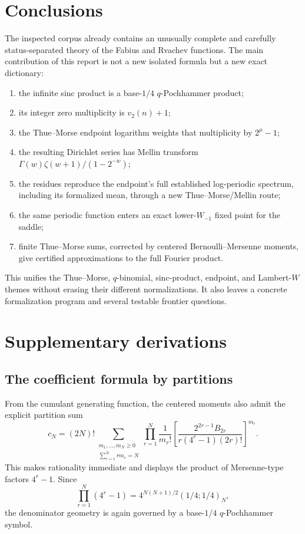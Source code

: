 \documentclass[11pt,oneside]{article}
\theoremstyle{definition}
\theoremstyle{remark}
\newcommand{\vtwo}{v_2}
\begin{document}
\section{Conclusions}
The inspected corpus already contains an unusually complete and carefully status-separated
theory of the Fabius and Rvachev functions.  The main contribution of this report is not a
new isolated formula but a new exact dictionary:
\begin{enumerate}
\item the infinite sinc product is a base-$1/4$ $q$-Pochhammer product;
\item its integer zero multiplicity is $\vtwo(n)+1$;
\item the Thue--Morse endpoint logarithm weights that multiplicity by $2^\mu-1$;
\item the resulting Dirichlet series has Mellin transform
$\Gamma(w)\zeta(w+1)/(1-2^{-w})$;
\item the residues reproduce the endpoint's full established log-periodic spectrum,
including its formalized mean, through a new Thue--Morse/Mellin route;
\item the same periodic function enters an exact lower-$W_{-1}$ fixed point for the saddle;
\item finite Thue--Morse sums, corrected by centered Bernoulli--Mersenne moments, give
certified approximations to the full Fourier product.
\end{enumerate}
This unifies the Thue--Morse, $q$-binomial, sinc-product, endpoint, and Lambert-$W$ themes
without erasing their different normalizations.  It also leaves a concrete formalization
program and several testable frontier questions.

\appendix
\section{Supplementary derivations}

\subsection{The coefficient formula by partitions}
From the cumulant generating function, the centered moments also admit the explicit
partition sum
\begin{equation}
 c_N=(2N)!\!\sum_{\substack{m_1,\ldots,m_N\ge0\\
                    \sum_{r=1}^Nrm_r=N}}
 \prod_{r=1}^N\frac1{m_r!}
 \left[
  \frac{2^{2r-1}B_{2r}}{r(4^r-1)(2r)!}
 \right]^{m_r}.                                            \label{eq:partition-moments}
\end{equation}
This makes rationality immediate and displays the product of Mersenne-type factors
$4^r-1$.  Since
\[
 \prod_{r=1}^N(4^r-1)=4^{N(N+1)/2}(1/4;1/4)_N,
\]
the denominator geometry is again governed by a base-$1/4$ $q$-Pochhammer symbol.
\end{document}
